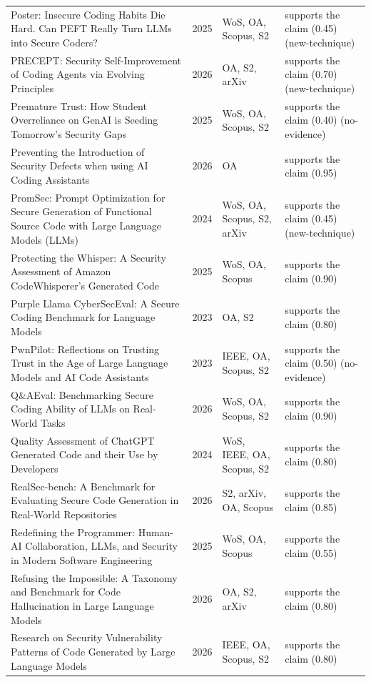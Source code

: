 \begin{longtable}{@{}%
  >{\raggedright\arraybackslash}p{}c%
  >{\raggedright\arraybackslash}p{}%
  >{\raggedright\arraybackslash}p{}@{}}
Poster: Insecure Coding Habits Die Hard. Can PEFT Really Turn LLMs into Secure Coders? & 2025 & WoS, OA, Scopus, S2 & supports the claim (0.45) (new-technique) \\
PRECEPT: Security Self-Improvement of Coding Agents via Evolving Principles & 2026 & OA, S2, arXiv & supports the claim (0.70) (new-technique) \\
Premature Trust: How Student Overreliance on GenAI is Seeding Tomorrow's Security Gaps & 2025 & WoS, OA, Scopus, S2 & supports the claim (0.40) (no-evidence) \\
Preventing the Introduction of Security Defects when using AI Coding Assistants & 2026 & OA & supports the claim (0.95) \\
PromSec: Prompt Optimization for Secure Generation of Functional Source Code with Large Language Models (LLMs) & 2024 & WoS, OA, Scopus, S2, arXiv & supports the claim (0.45) (new-technique) \\
Protecting the Whisper: A Security Assessment of Amazon CodeWhisperer's Generated Code & 2025 & WoS, OA, Scopus & supports the claim (0.90) \\
Purple Llama CyberSecEval: A Secure Coding Benchmark for Language Models & 2023 & OA, S2 & supports the claim (0.80) \\
PwnPilot: Reflections on Trusting Trust in the Age of Large Language Models and AI Code Assistants & 2023 & IEEE, OA, Scopus, S2 & supports the claim (0.50) (no-evidence) \\
Q\&AEval: Benchmarking Secure Coding Ability of LLMs on Real-World Tasks & 2026 & WoS, OA, Scopus, S2 & supports the claim (0.90) \\
Quality Assessment of ChatGPT Generated Code and their Use by Developers & 2024 & WoS, IEEE, OA, Scopus, S2 & supports the claim (0.80) \\
RealSec-bench: A Benchmark for Evaluating Secure Code Generation in Real-World Repositories & 2026 & S2, arXiv, OA, Scopus & supports the claim (0.85) \\
Redefining the Programmer: Human-AI Collaboration, LLMs, and Security in Modern Software Engineering & 2025 & WoS, OA, Scopus & supports the claim (0.55) \\
Refusing the Impossible: A Taxonomy and Benchmark for Code Hallucination in Large Language Models & 2026 & OA, S2, arXiv & supports the claim (0.80) \\
Research on Security Vulnerability Patterns of Code Generated by Large Language Models & 2026 & IEEE, OA, Scopus, S2 & supports the claim (0.80) \\

\end{longtable}
